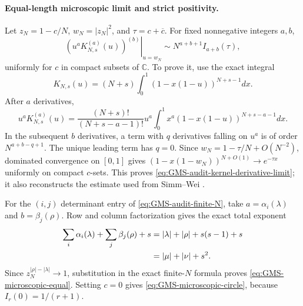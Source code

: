 \paragraph{Equal-length microscopic limit and strict positivity.}
Let $z_N=1-c/N$, $w_N=|z_N|^2$, and $\tau=c+\overline c$.  For fixed nonnegative integers
$a,b$,
\begin{equation}
 \left.
 \left(u^aK_{N,s}^{(a)}(u)\right)^{(b)}
 \right|_{u=w_N}
 \sim N^{a+b+1}I_{a+b}(\tau),
 \label{eq:GMS-audit-kernel-derivative-limit}
\end{equation}
uniformly for $c$ in compact subsets of $\mathbb C$.  To prove it, use the exact integral
\begin{equation}
 K_{N,s}(u)=(N+s)\int_0^1(1-x(1-u))^{N+s-1}dx.
 \label{eq:GMS-audit-kernel-integral}
\end{equation}
After $a$ derivatives,
\begin{equation}
 u^aK_{N,s}^{(a)}(u)
 =\frac{(N+s)!}{(N+s-a-1)!}u^a
 \int_0^1x^a(1-x(1-u))^{N+s-a-1}dx.
 \label{eq:GMS-audit-a-derivatives}
\end{equation}
In the subsequent $b$ derivatives, a term with $q$ derivatives falling on $u^a$ is of order
$N^{a+b-q+1}$.  The unique leading term has $q=0$.  Since
$w_N=1-\tau/N+O(N^{-2})$, dominated convergence on $[0,1]$ gives
$(1-x(1-w_N))^{N+O(1)}\to e^{-\tau x}$ uniformly on compact $c$-sets.  This proves
\eqref{eq:GMS-audit-kernel-derivative-limit}; it also reconstructs the estimate used from
Simm--Wei \cite[eqs.~(5.22)--(5.25)]{simmWei2026}.

For the $(i,j)$ determinant entry of \eqref{eq:GMS-audit-finite-N}, take
$a=\alpha_i(\lambda)$ and $b=\beta_j(\rho)$.  Row and column factorization gives the exact
total exponent
\begin{align}
 \sum_i\alpha_i(\lambda)+\sum_j\beta_j(\rho)+s
 &=|\lambda|+|\rho|+s(s-1)+s\notag\\
 &=|\mu|+|\nu|+s^2.
 \label{eq:GMS-audit-equal-exponent}
\end{align}
Since $z_N^{|\rho|-|\lambda|}\to1$, substitution in the exact finite-$N$ formula proves
\eqref{eq:GMS-microscopic-equal}.  Setting $c=0$ gives
\eqref{eq:GMS-microscopic-circle}, because $I_r(0)=1/(r+1)$.

